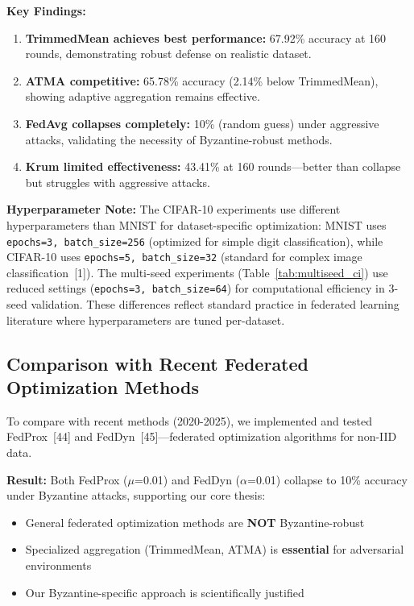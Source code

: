 \documentclass[12pt,a4paper,onecolumn]{article}
\begin{document}
\textbf{Key Findings:}
\begin{enumerate}
    \item \textbf{TrimmedMean achieves best performance:} 67.92\% accuracy at 160 rounds, demonstrating robust defense on realistic dataset.
    \item \textbf{ATMA competitive:} 65.78\% accuracy (2.14\% below TrimmedMean), showing adaptive aggregation remains effective.
    \item \textbf{FedAvg collapses completely:} 10\% (random guess) under aggressive attacks, validating the necessity of Byzantine-robust methods.
    \item \textbf{Krum limited effectiveness:} 43.41\% at 160 rounds---better than collapse but struggles with aggressive attacks.
\end{enumerate}

\textbf{Hyperparameter Note:} The CIFAR-10 experiments use different hyperparameters than MNIST for dataset-specific optimization: MNIST uses \texttt{epochs=3, batch\_size=256} (optimized for simple digit classification), while CIFAR-10 uses \texttt{epochs=5, batch\_size=32} (standard for complex image classification~[1]). The multi-seed experiments (Table~\ref{tab:multiseed_ci}) use reduced settings (\texttt{epochs=3, batch\_size=64}) for computational efficiency in 3-seed validation. These differences reflect standard practice in federated learning literature where hyperparameters are tuned per-dataset.

\subsection{Comparison with Recent Federated Optimization Methods}

To compare with recent methods (2020-2025), we implemented and tested FedProx~[44] and FedDyn~[45]---federated optimization algorithms for non-IID data.

\textbf{Result:} Both FedProx ($\mu$=0.01) and FedDyn ($\alpha$=0.01) collapse to 10\% accuracy under Byzantine attacks, supporting our core thesis:
\begin{itemize}
    \item General federated optimization methods are \textbf{NOT} Byzantine-robust
    \item Specialized aggregation (TrimmedMean, ATMA) is \textbf{essential} for adversarial environments
    \item Our Byzantine-specific approach is scientifically justified
\end{itemize}
\end{document}
